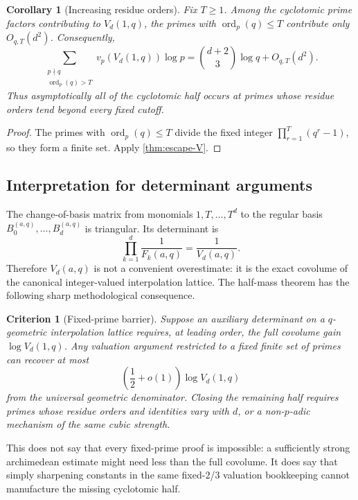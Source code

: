 \documentclass[11pt]{article}
\newtheorem{corollary}[theorem]{Corollary}
\newtheorem{criterion}[theorem]{Criterion}
\theoremstyle{definition}
\theoremstyle{remark}
\newcommand{\ord}{\operatorname{ord}}
\begin{document}
\begin{corollary}[Increasing residue orders]\label{cor:increasing-orders}
Fix $T\geq1$.  Among the cyclotomic prime factors contributing to
$V_d(1,q)$, the primes with $\ord_p(q)\leq T$ contribute only $O_{q,T}(d^2)$.
Consequently,
\[
 \sum_{\substack{p\nmid q\\\ord_p(q)>T}}
   v_p(V_d(1,q))\log p
 =\binom{d+2}{3}\log q+O_{q,T}(d^2).
\]
Thus asymptotically all of the cyclotomic half occurs at primes whose residue
orders tend beyond every fixed cutoff.
\end{corollary}

\begin{proof}
The primes with $\ord_p(q)\leq T$ divide the fixed integer
$\prod_{r=1}^{T}(q^r-1)$, so they form a finite set.  Apply
\cref{thm:escape-V}.
\end{proof}

\subsection{Interpretation for determinant arguments}

The change-of-basis matrix from monomials
$1,T,\ldots,T^d$ to the regular basis
$B_0^{(a,q)},\ldots,B_d^{(a,q)}$ is triangular.  Its determinant is
\[
 \prod_{k=1}^{d}\frac1{F_k(a,q)}=\frac1{V_d(a,q)}.
\]
Therefore $V_d(a,q)$ is not a convenient overestimate: it is the exact
covolume of the canonical integer-valued interpolation lattice.  The
half-mass theorem has the following sharp methodological consequence.

\begin{criterion}[Fixed-prime barrier]\label{crit:fixed-prime-barrier}
Suppose an auxiliary determinant on a $q$-geometric interpolation lattice
requires, at leading order, the full covolume gain $\log V_d(1,q)$.  Any
valuation argument restricted to a fixed finite set of primes can recover at
most
\[
 \left(\frac12+o(1)\right)\log V_d(1,q)
\]
from the universal geometric denominator.  Closing the remaining half
requires primes whose residue orders and identities vary with $d$, or a
non-$p$-adic mechanism of the same cubic strength.
\end{criterion}

This does not say that every fixed-prime proof is impossible: a sufficiently
strong archimedean estimate might need less than the full covolume.  It does
say that simply sharpening constants in the same fixed-$2$/$3$ valuation
bookkeeping cannot manufacture the missing cyclotomic half.
\end{document}
